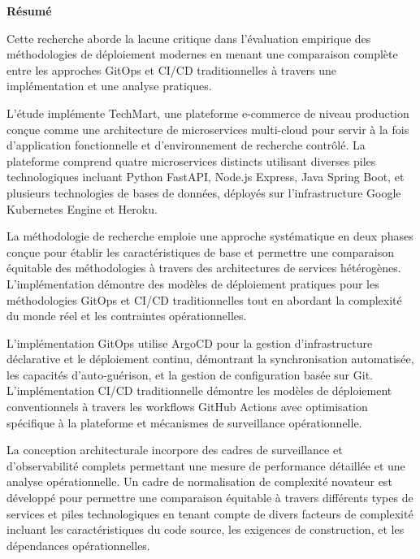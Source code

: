\thispagestyle{empty}

\begin{center}
{\Large \textbf{Résumé}}
\end{center}

\vspace{1cm}

Cette recherche aborde la lacune critique dans l'évaluation empirique des méthodologies de déploiement modernes en menant une comparaison complète entre les approches GitOps et CI/CD traditionnelles à travers une implémentation et une analyse pratiques.

L'étude implémente TechMart, une plateforme e-commerce de niveau production conçue comme une architecture de microservices multi-cloud pour servir à la fois d'application fonctionnelle et d'environnement de recherche contrôlé. La plateforme comprend quatre microservices distincts utilisant diverses piles technologiques incluant Python FastAPI, Node.js Express, Java Spring Boot, et plusieurs technologies de bases de données, déployés sur l'infrastructure Google Kubernetes Engine et Heroku.

La méthodologie de recherche emploie une approche systématique en deux phases conçue pour établir les caractéristiques de base et permettre une comparaison équitable des méthodologies à travers des architectures de services hétérogènes. L'implémentation démontre des modèles de déploiement pratiques pour les méthodologies GitOps et CI/CD traditionnelles tout en abordant la complexité du monde réel et les contraintes opérationnelles.

L'implémentation GitOps utilise ArgoCD pour la gestion d'infrastructure déclarative et le déploiement continu, démontrant la synchronisation automatisée, les capacités d'auto-guérison, et la gestion de configuration basée sur Git. L'implémentation CI/CD traditionnelle démontre les modèles de déploiement conventionnels à travers les workflows GitHub Actions avec optimisation spécifique à la plateforme et mécanismes de surveillance opérationnelle.

La conception architecturale incorpore des cadres de surveillance et d'observabilité complets permettant une mesure de performance détaillée et une analyse opérationnelle. Un cadre de normalisation de complexité novateur est développé pour permettre une comparaison équitable à travers différents types de services et piles technologiques en tenant compte de divers facteurs de complexité incluant les caractéristiques du code source, les exigences de construction, et les dépendances opérationnelles.

